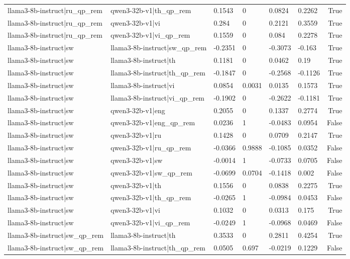 \begin{table}
\begin{tabular}{llllllr}
llama3-8b-instruct|ru_qp_rem & qwen3-32b-v1|th_qp_rem & 0.1543 & 0 & 0.0824 & 0.2262 & True \\
llama3-8b-instruct|ru_qp_rem & qwen3-32b-v1|vi & 0.284 & 0 & 0.2121 & 0.3559 & True \\
llama3-8b-instruct|ru_qp_rem & qwen3-32b-v1|vi_qp_rem & 0.1559 & 0 & 0.084 & 0.2278 & True \\
llama3-8b-instruct|sw & llama3-8b-instruct|sw_qp_rem & -0.2351 & 0 & -0.3073 & -0.163 & True \\
llama3-8b-instruct|sw & llama3-8b-instruct|th & 0.1181 & 0 & 0.0462 & 0.19 & True \\
llama3-8b-instruct|sw & llama3-8b-instruct|th_qp_rem & -0.1847 & 0 & -0.2568 & -0.1126 & True \\
llama3-8b-instruct|sw & llama3-8b-instruct|vi & 0.0854 & 0.0031 & 0.0135 & 0.1573 & True \\
llama3-8b-instruct|sw & llama3-8b-instruct|vi_qp_rem & -0.1902 & 0 & -0.2622 & -0.1181 & True \\
llama3-8b-instruct|sw & qwen3-32b-v1|eng & 0.2055 & 0 & 0.1337 & 0.2774 & True \\
llama3-8b-instruct|sw & qwen3-32b-v1|eng_qp_rem & 0.0236 & 1 & -0.0483 & 0.0954 & False \\
llama3-8b-instruct|sw & qwen3-32b-v1|ru & 0.1428 & 0 & 0.0709 & 0.2147 & True \\
llama3-8b-instruct|sw & qwen3-32b-v1|ru_qp_rem & -0.0366 & 0.9888 & -0.1085 & 0.0352 & False \\
llama3-8b-instruct|sw & qwen3-32b-v1|sw & -0.0014 & 1 & -0.0733 & 0.0705 & False \\
llama3-8b-instruct|sw & qwen3-32b-v1|sw_qp_rem & -0.0699 & 0.0704 & -0.1418 & 0.002 & False \\
llama3-8b-instruct|sw & qwen3-32b-v1|th & 0.1556 & 0 & 0.0838 & 0.2275 & True \\
llama3-8b-instruct|sw & qwen3-32b-v1|th_qp_rem & -0.0265 & 1 & -0.0984 & 0.0453 & False \\
llama3-8b-instruct|sw & qwen3-32b-v1|vi & 0.1032 & 0 & 0.0313 & 0.175 & True \\
llama3-8b-instruct|sw & qwen3-32b-v1|vi_qp_rem & -0.0249 & 1 & -0.0968 & 0.0469 & False \\
llama3-8b-instruct|sw_qp_rem & llama3-8b-instruct|th & 0.3533 & 0 & 0.2811 & 0.4254 & True \\
llama3-8b-instruct|sw_qp_rem & llama3-8b-instruct|th_qp_rem & 0.0505 & 0.697 & -0.0219 & 0.1229 & False \\

\end{tabular}
\end{table}

